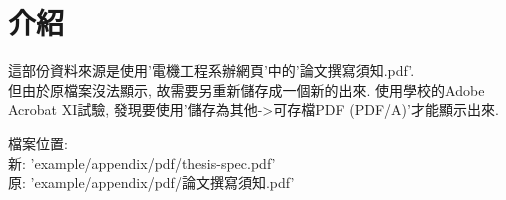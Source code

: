 
\section{介紹}
這部份資料來源是使用'電機工程系辦網頁'中的'論文撰寫須知.pdf'\cite{web:ncku:thesis-need-to-know}.\\

但由於原檔案沒法顯示, 故需要另重新儲存成一個新的出來. 使用學校的Adobe Acrobat XI試驗, 發現要使用'儲存為其他->可存檔PDF (PDF/A)'才能顯示出來.\\


檔案位置:\\
新: 'example/appendix/pdf/thesis-spec.pdf'\\
原: 'example/appendix/pdf/論文撰寫須知.pdf'\\



\EndChapter
